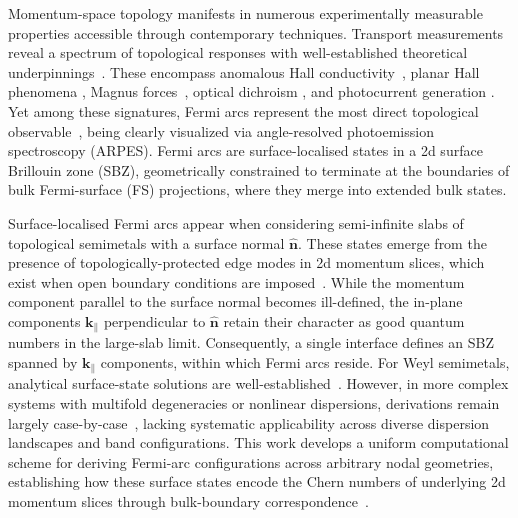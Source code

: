 \documentclass[aps,prb,onecolumn, footinbib, 10pt]{revtex4-2}
\begin{document}
Momentum-space topology manifests in numerous experimentally measurable properties accessible through contemporary techniques. Transport measurements reveal a spectrum of topological responses with well-established theoretical underpinnings~\cite{timm, ips_rahul_ph_strain, rahul-jpcm, ips-ruiz, ips-tilted, ips-floquet, ips-kush-review, claudia-multifold, ips-rsw-ph, ips-shreya}. These encompass anomalous Hall conductivity~\cite{haldane04_berry, goswami13_axionic, burkov14_anomolous}, planar Hall phenomena \cite{zhang16_linear, chen16_thermoelectric, nandy_2017_chiral, nandy18_Berry, amit_magneto,  pal22a_berry, fu22_thermoelectric, timm, staalhammar20_magneto, yadav23_magneto, ips_rahul_ph_strain, rahul-jpcm, ips-ruiz, ips-tilted, ips-rsw-ph,ips-internode, ips-shreya, ips-spin1-ph, ips-exact-spin1, ips-nl-ph,  claudia-multifold, ips-exact-kwn}, Magnus forces~\cite{papaj_magnus, amit-magnus, ips-magnus}, optical dichroism \cite{ips-cd1, ips_cd}, and photocurrent generation \cite{moore18_optical, guo23_light,kozii, ips_cpge}. Yet among these signatures, Fermi arcs represent the most direct topological observable~\cite{yang_Weyl, lv_Weyl_arc, sanchez, spin1-arc,shroter-arc, Yao2020, multifold-rhsi, quad-weyl-arc}, being clearly visualized via angle-resolved photoemission spectroscopy (ARPES). Fermi arcs are surface-localised states in a 2d surface Brillouin zone (SBZ), geometrically constrained to terminate at the boundaries of bulk Fermi-surface (FS) projections, where they merge into extended bulk states.


Surface-localised Fermi arcs appear when considering semi-infinite slabs of topological semimetals with a surface normal $\boldsymbol{\hat n}$. These states emerge from the presence of topologically-protected edge modes in 2d momentum slices, which exist when open boundary conditions are imposed~\cite{burkov11_Weyl, hosur1, hosur-review}. While the momentum component parallel to the surface normal becomes ill-defined, the in-plane components $\boldsymbol k_\parallel$ perpendicular to $\boldsymbol{\hat n}$ retain their character as good quantum numbers in the large-slab limit. Consequently, a single interface defines an SBZ spanned by $\boldsymbol k_\parallel$ components, within which Fermi arcs reside. For Weyl semimetals, analytical surface-state solutions are well-established~\cite{witten, hashimoto-arc-weyl, babak-arc-weyl, inti-arc-weyl}. However, in more complex systems with multifold degeneracies or nonlinear dispersions, derivations remain largely case-by-case~\cite{witten, okugawa-arc-weyl, liu-arc-mutiweyl, jafari-arc-weyl, trauzettel-arc-weyl, ewelina-surface-states}, lacking systematic applicability across diverse dispersion landscapes and band configurations. This work develops a uniform computational scheme for deriving Fermi-arc configurations across arbitrary nodal geometries, establishing how these surface states encode the Chern numbers of underlying 2d momentum slices through bulk-boundary correspondence~\cite{burkov11_Weyl, hosur1, hosur-review}.
\end{document}
